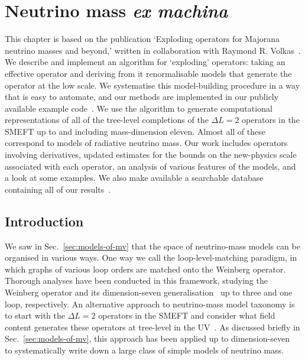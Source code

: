 \graphicspath{{img/chapter_2/}}

\chapter{Neutrino mass \textit{ex machina}}
\label{chapter:mv-models}

\begin{synopsis}
  This chapter is based on the publication `Exploding operators for Majorana
  neutrino masses and beyond,' written in collaboration with Raymond R.
  Volkas~\cite{Gargalionis:2020xvt}. We describe and implement an algorithm for
  `exploding' operators: taking an effective operator and deriving from it
  renormalisable models that generate the operator at the low scale. We
  systematise this model-building procedure in a way that is easy to automate,
  and our methods are implemented in our publicly available example
  code~\cite{neutrinomass2020}. We use the algorithm to generate computational
  representations of all of the tree-level completions of the $\Delta L = 2$
  operators in the SMEFT up to and including mass-dimension eleven. Almost all
  of these correspond to models of radiative neutrino mass. Our work includes
  operators involving derivatives, updated estimates for the bounds on the
  new-physics scale associated with each operator, an analysis of various
  features of the models, and a look at some examples. We also make available a
  searchable database containing all of our
  results~\cite{gargalionis_john_2020_4054618}.
\end{synopsis}

\section{Introduction}

We saw in Sec.~\ref{sec:models-of-mv} that the space of neutrino-mass models can
be organised in various ways. One way we call the loop-level-matching paradigm,
in which graphs of various loop orders are matched onto the Weinberg operator.
Thorough analyses have been conducted in this framework, studying the Weinberg
operator and its dimension-seven generalisation~\cite{Bonnet:2012kz,
  Sierra:2014rxa, Cepedello:2018rfh, Cepedello:2017eqf} up to three and one
loop, respectively. An alternative approach to neutrino-mass model taxonomy is
to start with the $\Delta L = 2$ operators in the SMEFT and consider what field
content generates these operators at tree-level in the UV~\cite{Babu:2001ex,
  deGouvea:2007qla, PhysRevD.87.073007, Cai:2014kra}. As discussed briefly in
Sec.~\ref{sec:models-of-mv}, this approach has been applied up to
dimension-seven~\cite{Cai:2014kra} to systematically write down a large class of
simple models of neutrino mass.

